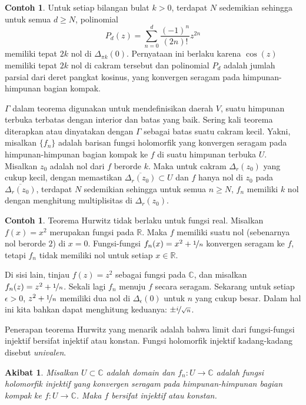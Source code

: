 \documentclass[12pt,openany]{book}
\newcommand{\C}{{\mathbb{C}}}
\newcommand{\R}{{\mathbb{R}}}
\newcommand{\myindex}[1]{#1\index{#1}}
\theoremstyle{plain}
\newtheorem{cor}[thm]{Akibat}
\theoremstyle{remark}
\theoremstyle{definition}
\theoremstyle{exercise}
\theoremstyle{example}
\newtheorem{example}[thm]{Contoh}
\begin{document}
\begin{example}
Untuk setiap bilangan bulat $k > 0$, terdapat $N$ sedemikian sehingga
untuk semua $d \geq N$,
polinomial
\begin{equation*}
P_d(z) = \sum_{n=0}^d \frac{{(-1)}^n}{(2n)!}z^{2n}
\end{equation*}
memiliki tepat $2k$ nol di $\Delta_{\pi k}(0)$.
Pernyataan ini berlaku karena $\cos(z)$ memiliki tepat $2k$ nol di cakram tersebut
dan polinomial $P_d$ adalah jumlah parsial dari deret pangkat
kosinus, yang konvergen seragam pada himpunan-himpunan bagian kompak.
\end{example}
  
$\Gamma$ dalam teorema digunakan untuk mendefinisikan daerah
$V$, suatu himpunan terbuka terbatas dengan interior dan batas yang baik.
Sering kali teorema diterapkan atau dinyatakan dengan $\Gamma$ sebagai
batas suatu cakram kecil.
Yakni, misalkan $\{ f_n \}$ adalah barisan fungsi holomorfik
yang konvergen seragam
pada himpunan-himpunan bagian kompak ke $f$ di suatu himpunan terbuka $U$.  Misalkan $z_0$ adalah nol dari
$f$ berorde $k$.  Maka untuk cakram $\Delta_r(z_0)$ yang cukup kecil,
dengan memastikan $\overline{\Delta_r(z_0)} \subset U$ dan
$f$ hanya nol di $z_0$ pada $\overline{\Delta_r(z_0)}$,
terdapat $N$ sedemikian sehingga
untuk semua $n \geq N$, $f_n$ memiliki $k$ nol dengan menghitung multiplisitas di
$\Delta_r(z_0)$.

\begin{example}
Teorema Hurwitz tidak berlaku untuk fungsi real.  Misalkan $f(x) =
x^2$ merupakan fungsi pada $\R$.  Maka $f$ memiliki suatu nol (sebenarnya nol berorde $2$)
di $x=0$.  Fungsi-fungsi $f_n(x) = x^2+\nicefrac{1}{n}$ konvergen seragam
ke $f$, tetapi $f_n$ tidak memiliki nol untuk setiap $x \in \R$.

Di sisi lain, tinjau $f(z) = z^2$ sebagai fungsi pada $\C$, dan misalkan
$f_n(z) = z^2+\nicefrac{1}{n}$.  Sekali lagi $f_n$ menuju $f$ secara seragam.  Sekarang untuk
setiap $\epsilon > 0$, $z^2+\nicefrac{1}{n}$ memiliki
dua nol di $\Delta_\epsilon(0)$ untuk $n$ yang cukup besar.  Dalam hal ini kita bahkan dapat menghitung
keduanya: $\pm \nicefrac{i}{\sqrt{n}}$.
\end{example}

Penerapan teorema Hurwitz yang menarik adalah bahwa limit dari
fungsi-fungsi injektif bersifat injektif atau konstan.
Fungsi holomorfik injektif
kadang-kadang disebut \emph{\myindex{univalen}}.

\begin{cor} \label{cor:univalentlimit}
Misalkan $U \subset \C$ adalah domain dan $f_n \colon U \to \C$ adalah
fungsi holomorfik injektif yang konvergen seragam pada himpunan-himpunan bagian kompak
ke $f \colon U \to \C$.  Maka $f$ bersifat injektif atau konstan.
\end{cor}
\end{document}
